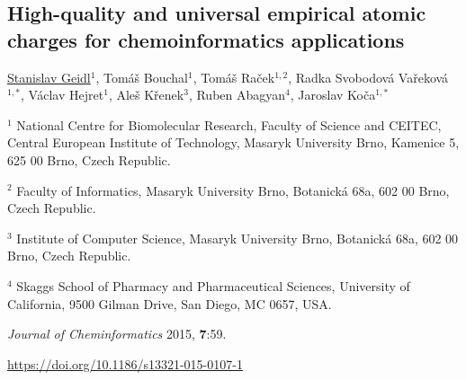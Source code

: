\begin{center}
\section{High-quality and universal empirical atomic
charges for chemoinformatics applications}

\underline{Stanislav Geidl}$^1$, Tomáš Bouchal$^1$, Tomáš Raček$^{1,2}$,
Radka Svobodová Vařeková$^{1, *}$, Václav Hejret$^1$, Aleš Křenek$^3$,
Ruben Abagyan$^4$, Jaroslav Koča$^{1, *}$

\vspace{1cm}

$^1$ National Centre for Biomolecular Research, Faculty of Science and CEITEC,
Central European Institute of Technology, Masaryk University Brno, Kamenice 5,
625 00 Brno, Czech Republic.

$^2$ Faculty of Informatics, Masaryk University Brno, Botanická 68a, 602 00 Brno,
Czech Republic.

$^3$ Institute of Computer Science, Masaryk University Brno, Botanická 68a,
602 00 Brno, Czech Republic.

$^4$ Skaggs School of Pharmacy and Pharmaceutical Sciences, University of
California, 9500 Gilman Drive, San Diego, MC 0657, USA.

\vspace{1cm}

\textit{Journal of Cheminformatics} 2015, \textbf{7}:59.

\vspace{1cm}

\url{https://doi.org/10.1186/s13321-015-0107-1}

\end{center}




